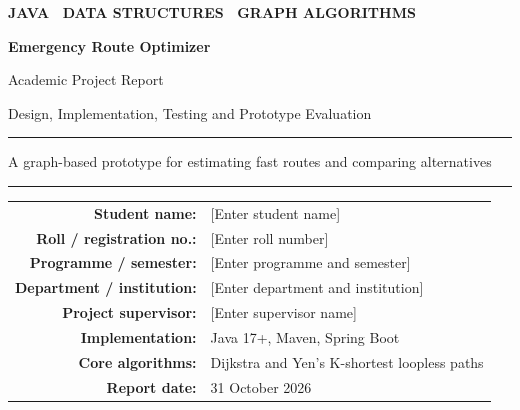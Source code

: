 \documentclass[11pt,a4paper]{article}
\begin{document}
\begin{titlepage}
  \centering
  \vspace*{13mm}
  {\Large\bfseries\color{blue} JAVA \textbullet\ DATA STRUCTURES \textbullet\ GRAPH ALGORITHMS\par}
  \vspace{17mm}
  {\Huge\bfseries\color{navy} Emergency Route Optimizer\par}
  \vspace{7mm}
  {\Large Academic Project Report\par}
  \vspace{5mm}
  {\large Design, Implementation, Testing and Prototype Evaluation\par}
  \vspace{13mm}
  \rule{0.84\textwidth}{1.2pt}\par
  \vspace{7mm}
  {\large A graph-based prototype for estimating fast routes and comparing alternatives\par}
  \vspace{7mm}
  \rule{0.84\textwidth}{1.2pt}\par
  \vfill
  \begin{tabular}{rl}
    \textbf{Student name:} & [Enter student name]\\[4pt]
    \textbf{Roll / registration no.:} & [Enter roll number]\\[4pt]
    \textbf{Programme / semester:} & [Enter programme and semester]\\[4pt]
    \textbf{Department / institution:} & [Enter department and institution]\\[4pt]
    \textbf{Project supervisor:} & [Enter supervisor name]\\[4pt]
    \textbf{Implementation:} & Java 17+, Maven, Spring Boot\\[4pt]
    \textbf{Core algorithms:} & Dijkstra and Yen's K-shortest loopless paths\\[4pt]
    \textbf{Report date:} & 31 October 2026
  \end{tabular}
  \vfill
\end{titlepage}
\end{document}
